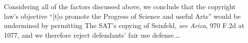 
Considering all of the factors discussed above, we conclude that the copyright
law's objective ``[t]o promote the Progress of Science and useful Arts'' would
be undermined by permitting The SAT's copying of Seinfeld, \emph{see}
\emph{Arica}, 970 F.2d
at 1077, and we therefore reject defendants' fair use defense.\ldots

